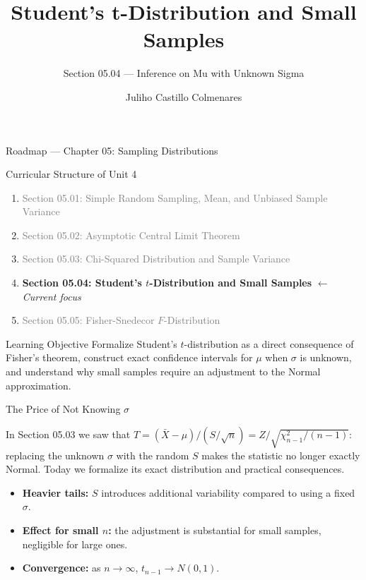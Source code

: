 \documentclass[aspectratio=169,xcolor={dvipsnames,table}]{beamer}
\title{Student's t-Distribution and Small Samples}
\subtitle{Section 05.04 --- Inference on Mu with Unknown Sigma}
\author[J. Castillo Colmenares]{Juliho Castillo Colmenares}
\institute[Tec de Monterrey]{Tecnologico de Monterrey}
\date{\vspace{-1.5cm}}
\begin{document}
\begin{frame}[plain]
	\titlepage
\end{frame}

\begin{frame}{Roadmap --- Chapter 05: Sampling Distributions}
	\vspace{-0.15cm}
	\begin{block}{Curricular Structure of Unit 4}
		\footnotesize
		\begin{enumerate}\itemsep=0.03cm
			\item \textcolor{gray}{Section 05.01: Simple Random Sampling, Mean, and Unbiased Sample Variance}
			\item \textcolor{gray}{Section 05.02: Asymptotic Central Limit Theorem}
			\item \textcolor{gray}{Section 05.03: Chi-Squared Distribution and Sample Variance}
			\item \textbf{\textcolor{TecRojo}{Section 05.04: Student's $t$-Distribution and Small Samples}} $\leftarrow$ \emph{Current focus}
			\item \textcolor{gray}{Section 05.05: Fisher-Snedecor $F$-Distribution}
		\end{enumerate}
	\end{block}
	\vspace{-0.2cm}
	\begin{alertblock}{Learning Objective}
		\scriptsize
		Formalize Student's $t$-distribution as a direct consequence of Fisher's theorem, construct exact confidence intervals for $\mu$ when $\sigma$ is unknown, and understand why small samples require an adjustment to the Normal approximation.
	\end{alertblock}
\end{frame}

\begin{frame}{The Price of Not Knowing $\sigma$}
	\footnotesize
	\begin{motivacion}
		In Section 05.03 we saw that $T=(\bar X-\mu)/(S/\sqrt n) = Z/\sqrt{\chi^2_{n-1}/(n-1)}$: replacing the unknown $\sigma$ with the random $S$ makes the statistic no longer exactly Normal. Today we formalize its exact distribution and practical consequences.
	\end{motivacion}
	\vspace{0.15cm}
	\pause
	\begin{itemize}\itemsep=0.1cm
		\item \textbf{Heavier tails:} $S$ introduces additional variability compared to using a fixed $\sigma$. \pause
		\item \textbf{Effect for small $n$:} the adjustment is substantial for small samples, negligible for large ones. \pause
		\item \textbf{Convergence:} as $n\to\infty$, $t_{n-1}\to N(0,1)$.
	\end{itemize}
\end{frame}
\end{document}
